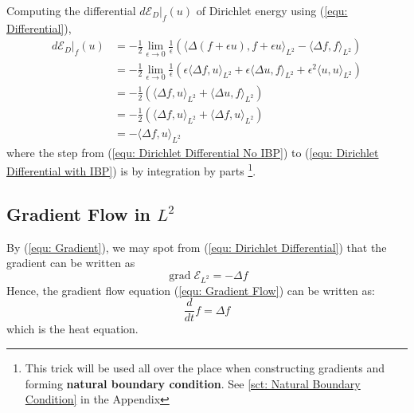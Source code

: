 \documentclass[a4paper]{article}
\theoremstyle{definition}
\DeclareMathOperator{\grad}{grad}
\begin{document}
Computing the differential $d \mathcal{E}_D|_f (u)$ of Dirichlet energy using (\ref{equ: Differential}),
\begin{align}
    d \mathcal{E}_D|_f(u) &= -\frac{1}{2} \lim_{\epsilon \rightarrow 0} \frac{1}{\epsilon} \left( \langle \Delta (f+\epsilon u), f + \epsilon u \rangle_{L^2} - \langle \Delta f, f \rangle_{L^2} \right) \\
    &= -\frac{1}{2} \lim_{\epsilon \rightarrow 0} \frac{1}{\epsilon} \left( \epsilon \langle \Delta f, u \rangle_{L^2} + \epsilon \langle \Delta u, f \rangle_{L^2} + \epsilon^2 \langle u, u \rangle_{L^2} \right) \\
    &= -\frac{1}{2} (\langle \Delta f,u \rangle_{L^2} + \langle \Delta u, f \rangle_{L^2})
    \label{equ: Dirichlet Differential No IBP}
    \\
    &= -\frac{1}{2} (\langle \Delta f,u \rangle_{L^2} + \langle \Delta f, u \rangle_{L^2})
    \label{equ: Dirichlet Differential with IBP}
    \\
    &= -\langle \Delta f, u \rangle_{L^2}
    \label{equ: Dirichlet Differential}
\end{align}
where the step from (\ref{equ: Dirichlet Differential No IBP}) to (\ref{equ: Dirichlet Differential with IBP}) is by integration by parts \footnote{This trick will be used all over the place when constructing gradients and forming \textbf{natural boundary condition}. See \ref{sct: Natural Boundary Condition} in the Appendix}.

\subsection{Gradient Flow in $L^2$}
By (\ref{equ: Gradient}), we may spot from (\ref{equ: Dirichlet Differential}) that the gradient can be written as
\begin{equation}
    \grad \mathcal{E}_{L^2} = - \Delta f
    \label{equ: L2 Gradient}
\end{equation}
Hence, the gradient flow equation (\ref{equ: Gradient Flow}) can be written as:
\begin{equation}
    \frac{d}{dt} f = \Delta f
    \label{equ: L2 Gradient Flow}
\end{equation}
which is the heat equation.
\end{document}
